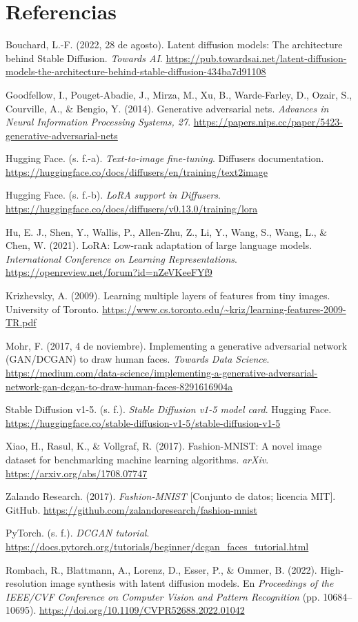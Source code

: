 \documentclass[12pt,letterpaper]{article}
\newcommand{\refapa}[1]{\par\noindent\hangindent=0.5in\hangafter=1 #1\par}
\begin{document}
\section{Referencias}
\refapa{Bouchard, L.-F. (2022, 28 de agosto). Latent diffusion models: The architecture behind Stable Diffusion. \textit{Towards AI}. \url{https://pub.towardsai.net/latent-diffusion-models-the-architecture-behind-stable-diffusion-434ba7d91108}}
\refapa{Goodfellow, I., Pouget-Abadie, J., Mirza, M., Xu, B., Warde-Farley, D., Ozair, S., Courville, A., \& Bengio, Y. (2014). Generative adversarial nets. \textit{Advances in Neural Information Processing Systems, 27}. \url{https://papers.nips.cc/paper/5423-generative-adversarial-nets}}
\refapa{Hugging Face. (s. f.-a). \textit{Text-to-image fine-tuning}. Diffusers documentation. \url{https://huggingface.co/docs/diffusers/en/training/text2image}}
\refapa{Hugging Face. (s. f.-b). \textit{LoRA support in Diffusers}. \url{https://huggingface.co/docs/diffusers/v0.13.0/training/lora}}
\refapa{Hu, E. J., Shen, Y., Wallis, P., Allen-Zhu, Z., Li, Y., Wang, S., Wang, L., \& Chen, W. (2021). LoRA: Low-rank adaptation of large language models. \textit{International Conference on Learning Representations}. \url{https://openreview.net/forum?id=nZeVKeeFYf9}}
\refapa{Krizhevsky, A. (2009). Learning multiple layers of features from tiny images. University of Toronto. \url{https://www.cs.toronto.edu/~kriz/learning-features-2009-TR.pdf}}
\refapa{Mohr, F. (2017, 4 de noviembre). Implementing a generative adversarial network (GAN/DCGAN) to draw human faces. \textit{Towards Data Science}. \url{https://medium.com/data-science/implementing-a-generative-adversarial-network-gan-dcgan-to-draw-human-faces-8291616904a}}
\refapa{Stable Diffusion v1-5. (s. f.). \textit{Stable Diffusion v1-5 model card}. Hugging Face. \url{https://huggingface.co/stable-diffusion-v1-5/stable-diffusion-v1-5}}
\refapa{Xiao, H., Rasul, K., \& Vollgraf, R. (2017). Fashion-MNIST: A novel image dataset for benchmarking machine learning algorithms. \textit{arXiv}. \url{https://arxiv.org/abs/1708.07747}}
\refapa{Zalando Research. (2017). \textit{Fashion-MNIST} [Conjunto de datos; licencia MIT]. GitHub. \url{https://github.com/zalandoresearch/fashion-mnist}}
\refapa{PyTorch. (s. f.). \textit{DCGAN tutorial}. \url{https://docs.pytorch.org/tutorials/beginner/dcgan_faces_tutorial.html}}
\refapa{Rombach, R., Blattmann, A., Lorenz, D., Esser, P., \& Ommer, B. (2022). High-resolution image synthesis with latent diffusion models. En \textit{Proceedings of the IEEE/CVF Conference on Computer Vision and Pattern Recognition} (pp. 10684--10695). \url{https://doi.org/10.1109/CVPR52688.2022.01042}}
\end{document}
